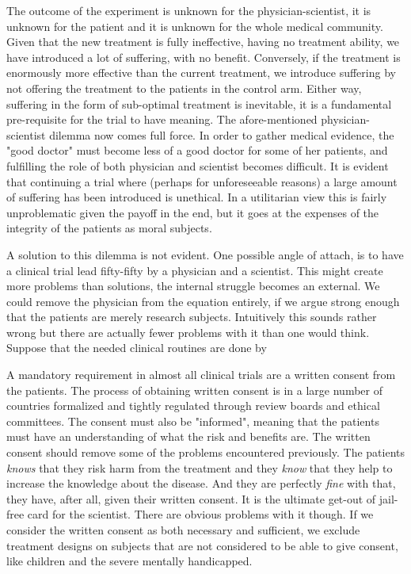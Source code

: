 \documentclass[12p]{article}
\begin{document}
The outcome of the experiment is unknown for the physician-scientist, it is unknown for the patient and it is unknown for the whole medical community.
Given that the new treatment is fully ineffective, having no treatment ability, we have introduced a lot of suffering, with no benefit.
Conversely, if the treatment is enormously more effective than the current treatment, we introduce suffering by not offering the treatment to the patients in the control arm.
Either way, suffering in the form of sub-optimal treatment is inevitable, it is a fundamental pre-requisite for the trial to have meaning.
The afore-mentioned physician-scientist dilemma now comes full force.
In order to gather medical evidence, the "good doctor" must become less of a good doctor for some of her patients, and fulfilling the role of both physician and scientist becomes difficult.
It is evident that continuing a trial where (perhaps for unforeseeable reasons) a large amount of suffering has been introduced is unethical.
In a utilitarian view this is fairly unproblematic given the payoff in the end, but it goes at the expenses of the integrity of the patients as moral subjects.

A solution to this dilemma is not evident.
One possible angle of attach, is to have a clinical trial lead fifty-fifty by a physician and a scientist.
This might create more problems than solutions, the internal struggle becomes an external.
We could remove the physician from the equation entirely, if we argue strong enough that the patients are merely research subjects.
Intuitively this sounds rather wrong but there are actually fewer problems with it than one would think.
Suppose that the needed clinical routines are done by 

A mandatory requirement in almost all clinical trials are a written consent from the patients.
The process of obtaining written consent is in a large number of countries formalized and tightly regulated through review boards and ethical committees.
The consent must also be "informed", meaning that the patients must have an understanding of what the risk and benefits are.
The written consent should remove some of the problems encountered previously.
The patients \emph{knows} that they risk harm from the treatment and they \emph{know} that they help to increase the knowledge about the disease.
And they are perfectly \emph{fine} with that, they have, after all, given their written consent. 
It is the ultimate get-out of jail-free card for the scientist.
There are obvious problems with it though.
If we consider the written consent as both necessary and sufficient, we exclude treatment designs on subjects that are not considered to be able to give consent, like children and the severe mentally handicapped.
\end{document}
